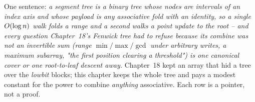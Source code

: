 

One sentence: \emph{a segment tree is a binary tree whose nodes are intervals of
an index axis and whose payload is any associative fold with an identity, so a
single \(O(\log n)\) walk folds a range and a second walks a point update to
the root -- and every question Chapter~18's Fenwick tree had to refuse because its
combine was not an invertible sum (range \(\min/\max/\gcd\) under arbitrary writes,
a maximum subarray, "the first position clearing a threshold") is one canonical
cover or one root-to-leaf descent away.} Chapter~18 kept an array that hid a tree
over the \emph{lowbit} blocks; this chapter keeps the whole tree and pays a modest
constant for the power to combine \emph{anything} associative. Each row is a
pointer, not a proof.

